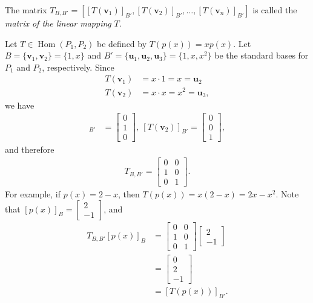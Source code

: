 \documentclass[12pt,letterpaper,reqno]{article}
\numberwithin{equation}{section}
\newcommand{\bv}{\mathbf{v}}
\newcommand{\bu}{\mathbf{u}}
\DeclareMathOperator{\Hom}{Hom}
\begin{document}
\begin{defn}\label{def:matrix_of_a_linear_mapping}
	The matrix $T_{B,B'}=[[T(\bv_1)]_{B'}, [T(\bv_2)]_{B'},\dots, [T(\bv_n)]_{B'}]$ is called the \emph{matrix of the linear mapping} $T$.
\end{defn}

\begin{example}
Let $T \in \Hom(P_1,P_2)$ be defined by $T(p(x))=xp(x)$. Let $B=\{\bv_1,\bv_2\}=\{1,x\}$ and $B'=\{\bu_1,\bu_2,\bu_3\}=\{1,x,x^2\}$ be the standard bases for $P_1$ and $P_2$, respectively. Since
\begin{align*}
	T(\bv_1)&=x\cdot 1=x=\bu_2 \\
	T(\bv_2)&=x \cdot x=x^2=\bu_3,
\end{align*}	
we have 
\begin{align*}
	[T(\bv_1)]_{B'}&=\begin{bmatrix}
		0 \\ 1 \\ 0
	\end{bmatrix}, \ 
	[T(\bv_2)]_{B'}=\begin{bmatrix}
		0 \\ 0 \\ 1
	\end{bmatrix},
\end{align*}
and therefore
\begin{align*}
	T_{B,B'}=\begin{bmatrix}
		0 & 0 \\ 1 & 0 \\ 0 & 1
	\end{bmatrix}.
\end{align*}
For example, if $p(x)=2-x$, then $T(p(x))=x(2-x)=2x-x^2$. Note that $[p(x)]_B=\begin{bmatrix}
	2 \\ -1
\end{bmatrix}$, and 
\begin{align*}
	T_{B,B'}[p(x)]_B&=\begin{bmatrix}
		0 & 0 \\ 1 & 0 \\ 0 & 1
	\end{bmatrix}\begin{bmatrix}
	2 \\ -1
\end{bmatrix} \\
&=\begin{bmatrix}
	0 \\ 2 \\ -1
\end{bmatrix} \\
&=[T(p(x))]_{B'}.
\end{align*}
\end{example}
\end{document}
